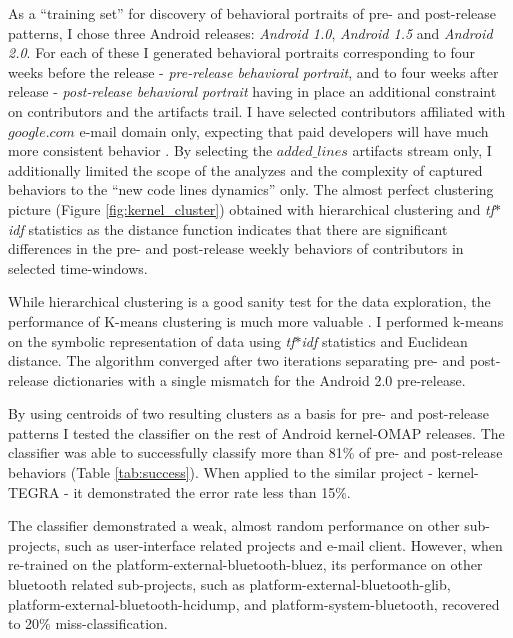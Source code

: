 \documentclass[conference]{IEEEtran}
\begin{document}
As a ``training set'' for discovery of behavioral portraits of pre- and post-release patterns, 
I chose three Android releases: \textit{Android 1.0}, \textit{Android 1.5} and \textit{Android 2.0}. 
For each of these I generated behavioral portraits corresponding to four weeks before the 
release - \textit{pre-release behavioral portrait}, 
and to four weeks after release - \textit{post-release behavioral portrait}
having in place an additional constraint on contributors and the artifacts trail. 
I have selected contributors affiliated with $google.com$ e-mail domain only, expecting
that paid developers will have much more consistent behavior \cite{citeulike:10392277}.
By selecting the $added\_lines$ artifacts stream only, I additionally limited the scope of the
analyzes and the complexity of captured behaviors to the ``new code lines dynamics'' only.
The almost perfect clustering picture (Figure \ref{fig:kernel_cluster}) 
obtained with hierarchical clustering and \textit{tf$\ast$idf} statistics as the distance function 
indicates that there are significant differences in the pre- and post-release weekly behaviors
 of contributors in selected time-windows.

While hierarchical clustering is a good sanity test for the data exploration, the performance of K-means 
clustering is much more valuable \cite{citeulike:3562}. I performed k-means on the symbolic 
representation of data using \textit{tf$\ast$idf} statistics and Euclidean distance. The algorithm converged after two
iterations separating pre- and post-release dictionaries with a single mismatch for the Android 2.0 pre-release.

By using centroids of two resulting clusters as a basis for pre- and post-release patterns I tested 
the classifier on the rest of Android kernel-OMAP releases. The classifier was able to successfully classify 
more than 81\% of pre- and post-release behaviors (Table \ref{tab:success}). 
When applied to the similar project - kernel-TEGRA - it demonstrated the error rate less than 15\%.

The classifier demonstrated a weak, almost random performance on other sub-projects, such as user-interface
related projects and e-mail client. However, when re-trained on the platform-external-bluetooth-bluez, 
its performance on other bluetooth related sub-projects, such as platform-external-bluetooth-glib,
platform-external-bluetooth-hcidump, and platform-system-bluetooth, recovered to 20\% miss-classification.
\end{document}
